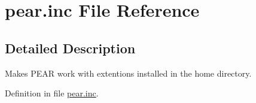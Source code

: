 \hypertarget{pear_8inc}{
\section{pear.inc File Reference}
\label{pear_8inc}
}


\subsection{Detailed Description}
Makes PEAR work with extentions installed in the home directory. 

Definition in file \hyperlink{pear_8inc-source}{pear.inc}.